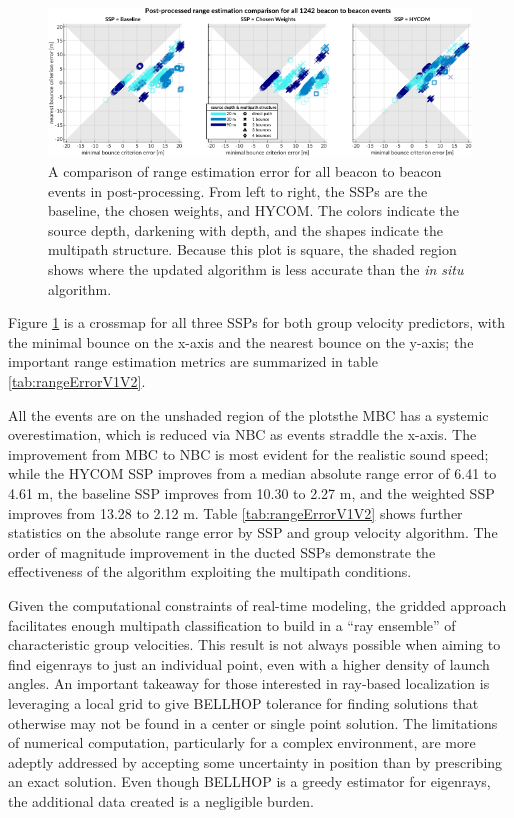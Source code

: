 \begin{figure}[h!]
\includegraphics[width=\textwidth]{figs/Fig7.pdf}
\caption{\label{fig:compareV1V2}{A comparison of range estimation error for all beacon to beacon events in post-processing. From left to right, the SSPs are the baseline, the chosen weights, and HYCOM. The colors indicate the source depth, darkening with depth, and the shapes indicate the multipath structure. Because this plot is square, the shaded region shows where the updated algorithm is less accurate than the \textit{in situ} algorithm.}}
\end{figure}

Figure \ref{fig:compareV1V2} is a crossmap for all three SSPs for both group velocity predictors, with the minimal bounce on the x-axis and the nearest bounce on the y-axis; the important range estimation metrics are summarized in table \ref{tab:rangeErrorV1V2}.

All the events are on the unshaded region of the plots\textemdash the MBC has a systemic overestimation, which is reduced via NBC as events straddle the x-axis.
The improvement from MBC to NBC is most evident for the realistic sound speed; while the HYCOM SSP improves from a median absolute range error of 6.41 to 4.61 m, the baseline SSP improves from 10.30 to 2.27 m, and the weighted SSP improves from 13.28 to 2.12 m.
Table \ref{tab:rangeErrorV1V2} shows further statistics on the absolute range error by SSP and group velocity algorithm.
The order of magnitude improvement in the ducted SSPs demonstrate the effectiveness of the algorithm exploiting the multipath conditions.

Given the computational constraints of real-time modeling, the gridded approach facilitates enough multipath classification to build in a ``ray ensemble'' of characteristic group velocities.
This result is not always possible when aiming to find eigenrays to just an individual point, even with a higher density of launch angles.
An important takeaway for those interested in ray-based localization is leveraging a local grid to give BELLHOP tolerance for finding solutions that otherwise may not be found in a center or single point solution.
The limitations of numerical computation, particularly for a complex environment, are more adeptly addressed by accepting some uncertainty in position than by prescribing an exact solution.
Even though BELLHOP is a greedy estimator for eigenrays, the additional data created is a negligible burden. 

